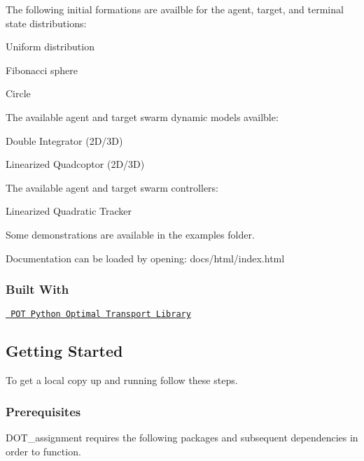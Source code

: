 The following initial formations are availble for the agent, target, and terminal state distributions\+:
\begin{DoxyItemize}
\item Uniform distribution
\item Fibonacci sphere
\item Circle
\end{DoxyItemize}

The available agent and target swarm dynamic models availble\+:
\begin{DoxyItemize}
\item Double Integrator (2D/3D)
\item Linearized Quadcoptor (2D/3D)
\end{DoxyItemize}

The available agent and target swarm controllers\+:
\begin{DoxyItemize}
\item Linearized Quadratic Tracker
\end{DoxyItemize}

Some demonstrations are available in the examples folder.

Documentation can be loaded by opening\+: docs/html/index.\+html

\subsubsection*{Built With}


\begin{DoxyItemize}
\item \href{https://github.com/rflamary/POT}{\texttt{ P\+OT Python Optimal Transport Library}}
\end{DoxyItemize}

\subsection*{Getting Started}

To get a local copy up and running follow these steps.

\subsubsection*{Prerequisites}

D\+O\+T\+\_\+assignment requires the following packages and subsequent dependencies in order to function.


